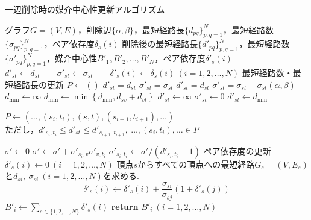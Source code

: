 \begin{algorithm}
  \caption{一辺削除時の媒介中心性更新アルゴリズム}
  \label{algo:insert}
  \begin{algorithmic}[1]
    \Require グラフ$G=(V,E)$，削除辺$\{\alpha,\beta\}$，最短経路長$\{d_{pq}\}_{p,q=1}^N$，最短経路数$\{\sigma_{pq}\}_{p,q=1}^N$，ペア依存度$\delta_s(i)$
    \Ensure 削除後の最短経路長$\{d'_{pq}\}_{p,q=1}^N$，最短経路数$\{\sigma'_{pq}\}_{p,q=1}^N$，媒介中心性$B'_1,B'_2,\ldots,B'_N$，ペア依存度$\delta'_s(i)$
    \State $d'_{st}\gets d_{st}\qquad\sigma'_{st}\gets\sigma_{st}\qquad\delta'_s(i)\gets\delta_s(i)\ (i=1,2,\ldots,N)$
    \Else
    \State\Comment 最短経路数・最短経路長の更新
    \State $P\gets()$
    \State $d'_{st}=d_{st}$
    \State $\sigma'_{st}=\sigma_{st}$
    \State $d'_{st}=d_{st}$
    \State $\sigma'_{st}=\sigma_{st}-\sigma_{st}(\alpha,\beta)$
    \State $d_{\min}\gets \infty$
    \State $d_{\min}\gets\min\left\{d_{\min},d_{sv}+d_{vt}\right\}$
    \EndFor
    \State $d'_{st}\gets\infty$
    \State $\sigma'_{st}\gets0$
    \Else
    \State $d'_{st}\gets d_{\min}$
    \State \parbox[t]{\linewidth}{
      $P\gets(\ldots,(s_i,t_i),(s,t),(s_{i+1},t_{i+1}),\ldots)$ \\
      ただし，$d'_{s_i,t_i}\leq d'_{st}\leq d'_{s_{i+1},t_{i+1}},\ \ldots,(s_i,t_i),\ldots\in P$
    }
    \EndIf
    \EndIf
    \EndFor
    \State $\sigma'\gets0$
    \State $\sigma'\gets\sigma'+\sigma'_{s_i,v}\sigma'_{v,t_i}$
    \EndFor
    \State $\sigma'_{s_i,t_i}\gets\sigma'/(d'_{s_i,t_i}-1)$
    \EndFor
    \State\Comment ペア依存度の更新
    \State $\delta'_s(i)\gets0\ (i=1,2,\ldots,N)$
    \State 頂点$s$からすべての頂点への最短経路$G_s=(V,E_s)$と$d_{si},\ \sigma_{si}\ (i=1,2,\ldots,N)$を求める. 
    \State \begin{equation*} \delta'_s(i)\gets\delta'_s(i)+\frac{\sigma_{si}}{\sigma_{sj}}(1+\delta'_s(j)) \end{equation*}
    \EndFor
    \EndIf
    \EndFor
    \State $B'_i\gets\sum_{s\in\{1,2,\ldots,N\}}\delta'_s(i)$
    \State \textbf{return} $B'_i\ (i=1,2,\ldots,N)$
  \end{algorithmic}
\end{algorithm}

